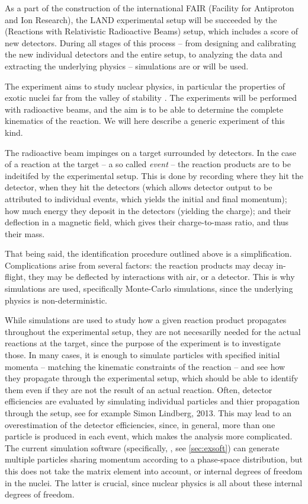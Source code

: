 As a part of the construction of the international FAIR (Facility for Antiproton and Ion Research), the LAND experimental setup will be succeeded by the \rtb{} (Reactions with Relativistic Radioactive Beams) setup, which includes a score of new detectors. During all stages of this process -- from designing and calibrating the new individual detectors and the entire setup, to analyzing the data and extracting the underlying physics -- simulations are or will be used. 

The \rtb{} experiment aims to study nuclear physics, in particular the properties of exotic nuclei far from the valley of stability \cite{r3b:online}. The experiments will be performed with radioactive beams, and the aim is to be able to determine the complete kinematics of the reaction. We will here describe a generic experiment of this kind.

The radioactive beam impinges on a target surrounded by detectors. In the case of a reaction at the target -- a so called \emph{event} -- the reaction products are to be indeitifed by the experimental setup. 
This is done by recording where they hit the detector, when they hit the detectors (which allows detector output to be attributed to individual events, which yields the initial and final momentum); how much energy they deposit in the detectors (yielding the charge); and their deflection in a magnetic field, which gives their charge-to-mass ratio, and thus their mass. 

That being said, the identification procedure outlined above is a simplification. Complications arise from several factors: the reaction products may decay in-flight, they may be deflected by interactions with air, or a detector. This is why simulations are used, specifically Monte-Carlo simulations, since the underlying physics is non-deterministic. 

While simulations are used to study how a given reaction product propagates throughout the experimental setup, they are not necesarilly needed for the actual reactions at the target, since the purpose of the experiment is to investigate those. 
In many cases, it is enough to simulate particles with specified initial momenta -- matching the kinematic constraints of the reaction -- and see how they propagate through the experimental setup, which should be able to identify them even if they are not the result of an actual reaction.
Often, detector efficiencies are evaluated by simulating individual particles and thier propagation through the setup, see for example Simon Lindberg, 2013\cite{simon:2013:thesis}. This may lead to an overestimation of the detector efficiencies, since, in general, more than one particle is produced in each event, which makes the analysis more complicated. The current simulation software (specifically, \cite{johansson:2013:online}, see \autoref{sec:exsoft}) can generate multiple particles sharing momentum according to a phase-space distribution, but this does not take the matrix element into account, or internal degrees of freedom in the nuclei. The latter is crucial, since nuclear physics is all about these internal degrees of freedom. 

